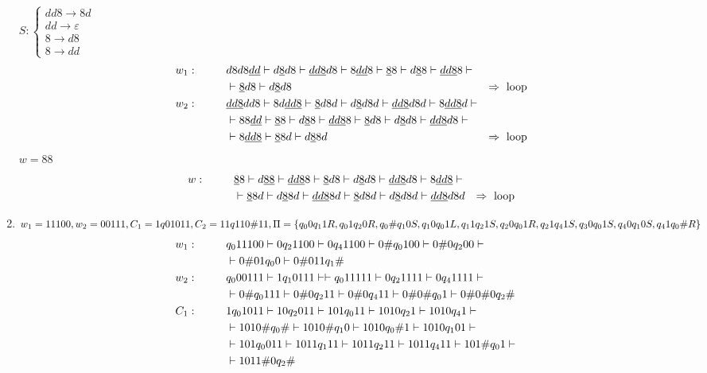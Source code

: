 \documentclass[a4paper,12pt, centered]{article}
\newcommand\tab[1][1cm]{\hspace*{#1}}
\begin{document}
\begin{enumerate}
\begin{align*}
		\end{align*}\newpage
		$S:\left\{\begin{array}{l}
		dd8\to8d\\dd\to\varepsilon\\8\to d8\\8\to dd
	\end{array} \right.$
		\begin{align*}
			w_1:\tab&d8d8\underline{dd}\vdash d\underline{8}d8\vdash \underline{dd8}d8\vdash 8\underline{dd}8\vdash \underline{8}8\vdash d\underline{8}8\vdash \underline{dd8}8\vdash\\&\vdash \underline{8}d8\vdash d\underline{8}d8&\Rightarrow\textrm{ loop} \\ 
			w_2:\tab&\underline{dd8}dd8\vdash 8d\underline{dd8}\vdash \underline{8}d8d\vdash d\underline{8}d8d\vdash \underline{dd8}d8d\vdash 8\underline{dd8}d\vdash\\&\vdash 88\underline{dd}\vdash\underline{8}8\vdash d\underline{8}8\vdash \underline{dd8}8\vdash \underline{8}d8\vdash d\underline{8}d8\vdash \underline{dd8}d8\vdash\\&\vdash8\underline{dd8}\vdash \underline{8}8d \vdash d\underline{8}8d&\Rightarrow\textrm{ loop}
		\end{align*}
		$w=88$
		\begin{align*}
			w:\tab&\underline{8}8\vdash d\underline{88}\vdash \underline{dd8}8\vdash\underline{8}d8\vdash d\underline{8}d8\vdash \underline{dd8}d8\vdash 8\underline{dd8}\vdash\\&\vdash \underline{8}8d\vdash d\underline{8}8d\vdash \underline{dd8}8d\vdash \underline{8}d8d\vdash d\underline{8}d8d\vdash \underline{dd8}d8d&\Rightarrow\textrm{ loop}
		\end{align*}
	\item $w_1 = 11100, w_2 = 00111, C_1 = 1q01011, C_2 = 11q110\#11, \Pi = \{ q_00q_11R, q_01q_20R,\\ q_0\#q_10S, q_10q_01L,
q_11q_21S, q_20q_01R, q_21q_41S, q_30q_01S, q_40q_10S, q_41q_0\#R\}$
		\begin{align*}
			w_1:\tab&q_011100\vdash0q_21100\vdash0q_41100\vdash0\#q_0100\vdash0\#0q_200\vdash&\\
			&\vdash0\#01q_00\vdash0\#011q_1\#\\
			w_2:\tab&q_000111\vdash1q_10111\vdash\vdash q_011111\vdash0q_21111\vdash0q_41111\vdash\\&\vdash0\#q_0111\vdash0\#0q_211\vdash0\#0q_411\vdash0\#0\#q_01\vdash0\#0\#0q_2\#\\
			C_1:\tab&1q_01011\vdash10q_2011\vdash101q_011\vdash1010q_21\vdash1010q_41\vdash&\\&\vdash1010\#q_0\#\vdash1010\#q_10\vdash1010q_0\#1\vdash1010q_101\vdash&\\&\vdash101q_0011\vdash1011q_111\vdash1011q_211\vdash1011q_411\vdash101\#q_01\vdash&\\&\vdash1011\#0q_2\#\\

\end{align*}
\end{enumerate}
\end{document}
